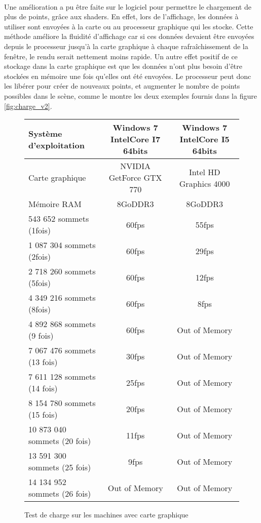 \paragraph{}
Une amélioration a pu être faite sur le logiciel pour permettre le chargement de plus de points, grâce aux shaders. En effet, lors de l'affichage, les données à utiliser sont envoyées à la carte ou au processeur graphique qui les stocke. Cette méthode améliore la fluidité d'affichage car si ces données devaient être envoyées depuis le processeur jusqu'à la carte graphique à chaque rafraîchissement de la fenêtre, le rendu serait nettement moins rapide. Un autre effet positif de ce stockage dans la carte graphique est que les données n'ont plus besoin d'être stockées en mémoire une fois qu'elles ont été envoyées. Le processeur peut donc les libérer pour créer de nouveaux points, et augmenter le nombre de points possibles dans le scène, comme le montre les deux exemples fournis dans la figure \ref{fig:charge_v2}.

\begin{figure}[h]
  \begin{changemargin}{-4cm}{-4cm}
    \centering
    \begin{tabular}{|l|c|c|}
      \hline
      Système d'exploitation & Windows 7 IntelCore I7 64bits & Windows 7 IntelCore I5 64bits\\ \hline
      Carte graphique &  NVIDIA GetForce GTX 770 & Intel HD Graphics 4000\\ \hline
      Mémoire RAM & 8GoDDR3 & 8GoDDR3 \\ \hline \hline
      543 652 sommets (1fois) & 60fps & 55fps \\ \hline
      1 087 304 sommets (2fois) & 60fps & 29fps \\ \hline
      2 718 260 sommets (5fois) & 60fps & 12fps \\ \hline
      4 349 216 sommets (8fois) & 60fps & 8fps  \\ \hline
      4 892 868 sommets (9 fois) & 60fps  & Out of Memory \\ \hline
      7 067 476 sommets (13 fois) & 30fps & Out of Memory \\ \hline
      7 611 128 sommets (14 fois) & 25fps & Out of Memory \\ \hline
      8 154 780 sommets (15 fois) & 20fps & Out of Memory \\ \hline
      10 873 040 sommets (20 fois) & 11fps & Out of Memory \\ \hline
      13 591 300 sommets (25 fois) & 9fps & Out of Memory \\ \hline
      14 134 952 sommets (26 fois) & Out of Memory & Out of Memory \\ \hline
    \end{tabular}
  \end{changemargin}
  \caption{Test de charge sur les machines avec carte graphique}
  \label{tab:fps_cg}
\end{figure}

